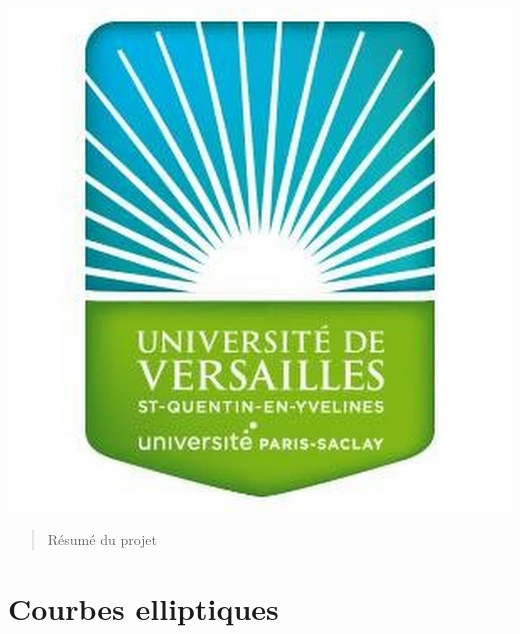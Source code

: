 \documentclass[letterpaper, 12pt]{article}
\begin{document}
\begin{titlepage}
\center {\large \today}\\[2cm]

\includegraphics[scale=0.15]{versailles.jpg}


\vfill %

\end{titlepage}

\tableofcontents
\newpage

\begin{abstract}
Résumé du projet
\end{abstract}

\section{Courbes elliptiques}
\end{document}
